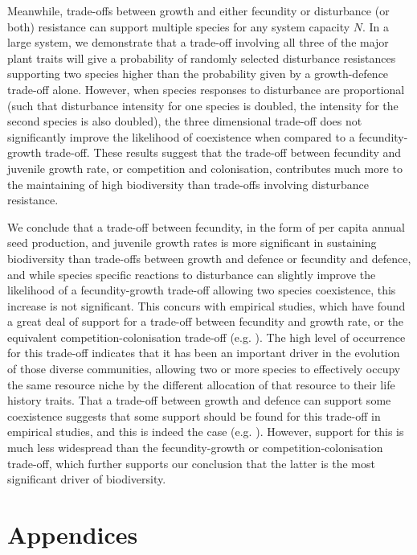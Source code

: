 \documentclass[preprint,10pt,reqno]{amsart}
\begin{document}
Meanwhile, trade-offs between growth and either fecundity or disturbance (or both) resistance can support multiple species for any system capacity $N$. In a large system, we demonstrate that a trade-off involving all three of the major plant traits will give a probability of randomly selected disturbance resistances supporting two species higher than the probability given by a growth-defence trade-off alone. However, when species responses to disturbance are proportional (such that disturbance intensity for one species is doubled, the intensity for the second species is also doubled), the three dimensional trade-off does not significantly improve the likelihood of coexistence when compared to a fecundity-growth trade-off. These results suggest that the trade-off between fecundity and juvenile growth rate, or competition and colonisation, contributes much more to the maintaining of high biodiversity than trade-offs involving disturbance resistance.  


We conclude that a trade-off between fecundity, in the form of per capita annual seed production, and juvenile growth rates is more significant in sustaining biodiversity than trade-offs between growth and defence or fecundity and defence, and while species specific reactions to disturbance can slightly improve the likelihood of a fecundity-growth trade-off allowing two species coexistence, this increase is not significant. This concurs with empirical studies, which have found a great deal of support for a trade-off between fecundity and growth rate, or the equivalent competition-colonisation trade-off (e.g. \cite{levins1971regional,yu2001competition,tilman1994competition,adler2000space}). The high level of occurrence for this trade-off indicates that it has been an important driver in the evolution of those diverse communities, allowing two or more species to effectively occupy the same resource niche by the different allocation of that resource to their life history traits. That a trade-off between growth and defence can support some coexistence suggests that some support should be found for this trade-off in empirical studies, and this is indeed the case (e.g. \cite{wright2010functional,fine2006growth}). However, support for this is much less widespread than the fecundity-growth or competition-colonisation trade-off, which further supports our conclusion that the latter is the most significant driver of biodiversity.

\section*{Appendices}
 \appendix
\end{document}
